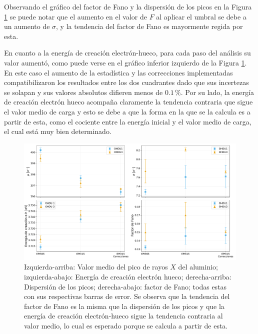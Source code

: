 Observando el gráfico del factor de Fano y la dispersión de los picos en la Figura \ref{fig:Al_mu_sigma_fano_eh} se puede notar que el aumento en el valor de $F$ al aplicar el umbral se debe a un aumento de $\sigma$, %
y la tendencia del factor de Fano es mayormente regida por esta.

En cuanto a la energía de creación electrón-hueco, para cada paso del análisis su valor aumentó, como puede verse en el gráfico inferior izquierdo de la Figura \ref{fig:Al_mu_sigma_fano_eh}. En este caso el aumento de la estadística y las correcciones implementadas compatibilizaron los resultados entre los dos cuadrantes dado que sus incertezas se solapan y sus valores absolutos difieren menos de $0.1\,\%$. Por su lado, la energía de creación electrón hueco acompaña claramente la tendencia contraria que sigue el valor medio de carga y esto se debe a que la forma en la que se la calcula es a partir de esta, como el cociente entre la energía inicial y el valor medio de carga, el cual está muy bien determinado.
\begin{figure}[h]
    \centering
        \includegraphics[scale=0.45]{Figs/Al_mu_sigma_fano_Eeh.pdf}
    \caption{Izquierda-arriba: Valor medio del pico de rayos $X$ del aluminio; izquierda-abajo: Energía de creación electrón hueco; derecha-arriba: Dispersión de los picos; derecha-abajo: factor de Fano; todas estas con sus respectivas barras de error. Se observa que la tendencia del factor de Fano es la misma que la dispersión de los picos y que la energía de creación electrón-hueco sigue la tendencia contraria al valor medio, lo cual es esperado porque se calcula a partir de esta.}
    \label{fig:Al_mu_sigma_fano_eh}
\end{figure}

